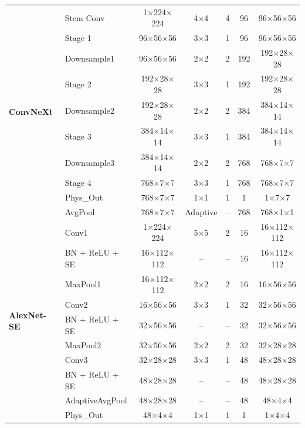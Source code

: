 \documentclass[final,5p,times,twocolumn]{elsarticle}
\begin{document}
\begin{table}[htbp]
\begin{tabular}{@{}llccccc@{}}
		\multirow{10}{*}{\textbf{ConvNeXt}} 
		&Stem Conv     & 1$\times$224$\times$224 & 4$\times$4  & 4      & 96              & 96$\times$56$\times$56 \\
		&Stage 1       & 96$\times$56$\times$56  & 3$\times$3  & 1      & 96              & 96$\times$56$\times$56 \\
		&Downsample1   & 96$\times$56$\times$56  & 2$\times$2  & 2      & 192             & 192$\times$28$\times$28 \\
		&Stage 2       & 192$\times$28$\times$28 & 3$\times$3  & 1      & 192             & 192$\times$28$\times$28 \\
		&Downsample2   & 192$\times$28$\times$28 & 2$\times$2  & 2      & 384             & 384$\times$14$\times$14 \\
		&Stage 3       & 384$\times$14$\times$14 & 3$\times$3  & 1      & 384             & 384$\times$14$\times$14 \\
		&Downsample3   & 384$\times$14$\times$14 & 2$\times$2  & 2      & 768             & 768$\times$7$\times$7 \\
		&Stage 4       & 768$\times$7$\times$7   & 3$\times$3  & 1      & 768             & 768$\times$7$\times$7 \\
		&Phys\_Out     & 768$\times$7$\times$7   & 1$\times$1  & 1      & 1               & 1$\times$7$\times$7 \\
		&AvgPool       & 768$\times$7$\times$7   & Adaptive    & --     & 768             & 768$\times$1$\times$1 \\
		\midrule
		
		\multirow{10}{*}{\textbf{AlexNet-SE}} 
		&Conv1        & 1$\times$224$\times$224 & 5$\times$5  & 2      & 16               & 16$\times$112$\times$112 \\
		&BN + ReLU + SE & 16$\times$112$\times$112 & --       & --     & 16               & 16$\times$112$\times$112 \\
		&MaxPool1     & 16$\times$112$\times$112 & 2$\times$2 & 2      & 16               & 16$\times$56$\times$56 \\
		&Conv2        & 16$\times$56$\times$56  & 3$\times$3  & 1      & 32               & 32$\times$56$\times$56 \\
		&BN + ReLU + SE & 32$\times$56$\times$56 & --       & --     & 32               & 32$\times$56$\times$56 \\
		&MaxPool2     & 32$\times$56$\times$56  & 2$\times$2 & 2      & 32               & 32$\times$28$\times$28 \\
		&Conv3        & 32$\times$28$\times$28  & 3$\times$3  & 1      & 48               & 48$\times$28$\times$28 \\
		&BN + ReLU + SE & 48$\times$28$\times$28 & --       & --     & 48               & 48$\times$28$\times$28 \\
		&AdaptiveAvgPool & 48$\times$28$\times$28 & --       & --     & 48               & 48$\times$4$\times$4 \\
		&Phys\_Out    & 48$\times$4$\times$4     & 1$\times$1  & 1      & 1                & 1$\times$4$\times$4 \\
		\bottomrule
	\end{tabular}
\end{table}
\end{document}
